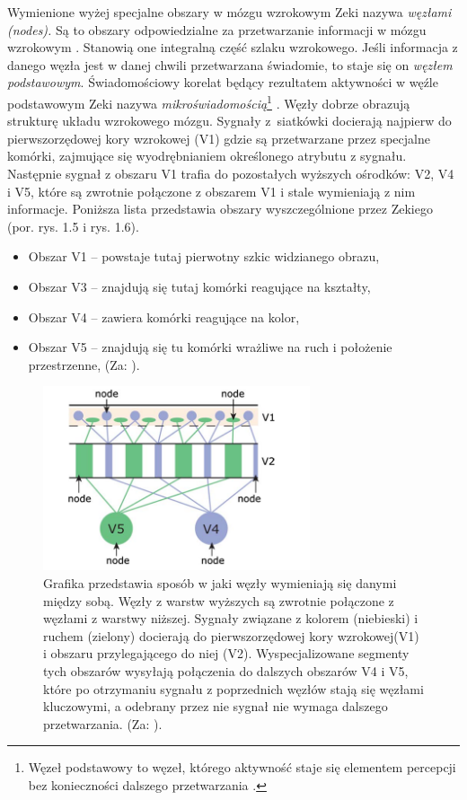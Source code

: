 \documentclass[licencjacka]{kdypl}
\begin{document}
Wymienione wyżej specjalne obszary w mózgu wzrokowym Zeki nazywa \textit{węzłami (nodes).} Są to obszary odpowiedzialne za przetwarzanie informacji w mózgu wzrokowym \citep[s. 426]{Wieloznacznosc}. Stanowią one integralną część szlaku wzrokowego. Jeśli informacja z danego węzła jest w danej chwili przetwarzana świadomie, to staje się on \textit{węzłem podstawowym}. Świadomościowy korelat będący rezultatem aktywności w węźle podstawowym Zeki nazywa \textit{mikroświadomością}\footnote{Węzeł podstawowy to węzeł, którego aktywność staje się elementem percepcji bez konieczności dalszego przetwarzania \citep[s. 81]{Zeki}.} \citep[s. 81]{Zeki}.
Węzły dobrze obrazują strukturę układu wzrokowego mózgu. Sygnały z~siatkówki docierają najpierw do pierwszorzędowej kory wzrokowej (V1) gdzie są przetwarzane przez specjalne komórki, zajmujące się wyodrębnianiem określonego atrybutu z sygnału. Następnie sygnał z obszaru V1 trafia do pozostałych wyższych ośrodków: V2, V4 i V5, które są zwrotnie  połączone z obszarem V1 i stale wymieniają z nim informacje.
Poniższa lista przedstawia obszary wyszczególnione przez Zekiego (por. rys. 1.5 i rys. 1.6). 



\begin{itemize}
\item Obszar V1 -- powstaje tutaj pierwotny szkic widzianego obrazu, 
\item Obszar V3 -- znajdują się tutaj komórki reagujące na kształty,
\item Obszar V4 -- zawiera komórki reagujące na kolor,
\item Obszar V5 -- znajdują się tu komórki wrażliwe na ruch i położenie przestrzenne, 
(Za: \citealt[s. 426-429]{Wieloznacznosc}).
\end{itemize}



\begin{figure}[H]
\includegraphics[width=0.7\textwidth]{wezel}
\centering
\caption{Grafika przedstawia sposób w jaki węzły wymieniają się danymi między sobą. Węzły z warstw wyższych są zwrotnie połączone z węzłami z warstwy niższej. Sygnały związane z kolorem (niebieski) i ruchem (zielony) docierają do pierwszorzędowej kory wzrokowej(V1) i obszaru przylegającego do niej (V2). Wyspecjalizowane segmenty tych obszarów wysyłają połączenia do dalszych obszarów V4 i V5, które po otrzymaniu sygnału z poprzednich węzłów stają się węzłami kluczowymi, a odebrany przez nie sygnał nie wymaga dalszego przetwarzania. (Za: \citealt[s. 426]{Wieloznacznosc}).}
\end{figure}
\end{document}

